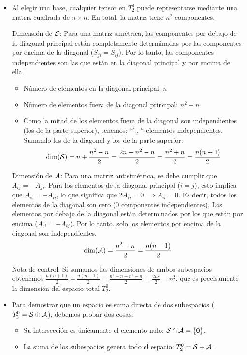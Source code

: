 \documentclass[11pt,spanish]{article}
\begin{document}
\begin{itemize}
Al cumplir las tres propiedades, $\cal{A}$ es un subespacio vectorial de $T_2^0$.

\item[b)]
Al elegir una base, cualquier tensor en $T_2^0$ puede representarse mediante una matriz cuadrada de $n \times n$. En total, la matriz tiene $n^2$ componentes.

Dimensión de $\cal{S}$:
Para una matriz simétrica, las componentes por debajo de la diagonal principal están completamente determinadas por las componentes por encima de la diagonal ($S_{ji} = S_{ij}$). Por lo tanto, las componentes independientes son las que están en la diagonal principal y por encima de ella.
\begin{itemize}
\item Número de elementos en la diagonal principal: $n$
\item Número de elementos fuera de la diagonal principal: $n^2 - n$
\item Como la mitad de los elementos fuera de la diagonal son independientes (los de la parte superior), tenemos: $\frac{n^2 - n}{2}$ elementos independientes.
Sumando los de la diagonal y los de la parte superior:
$$\dim({\cal S}) = n + \frac{n^2 - n}{2} = \frac{2n + n^2 - n}{2} = \frac{n^2 + n}{2} = \frac{n(n+1)}{2}$$
\end{itemize}

Dimensión de $\cal{A}$:
Para una matriz antisimétrica, se debe cumplir que $A_{ij} = -A_{ji}$.
Para los elementos de la diagonal principal ($i = j$), esto implica que $A_{ii} = -A_{ii}$, lo que significa que $2A_{ii} = 0 \implies A_{ii} = 0$. Es decir, todos los elementos de la diagonal son cero (0 componentes independientes).
Los elementos por debajo de la diagonal están determinados por los que están por encima ($A_{ji} = -A_{ij}$). Por lo tanto, solo los elementos por encima de la diagonal son independientes.
$$\dim({\cal A}) = \frac{n^2 - n}{2} = \frac{n(n-1)}{2}$$

Nota de control: Si sumamos las dimensiones de ambos subespacios obtenemos $\frac{n(n+1)}{2} + \frac{n(n-1)}{2} = \frac{n^2+n+n^2-n}{2} = \frac{2n^2}{2} = n^2$, que es precisamente la dimensión del espacio total $T_2^0$.

\item[c)]
Para demostrar que un espacio es suma directa de dos subespacios ($T_2^0 = \cal{S} \oplus \cal{A}$), debemos probar dos cosas:
\begin{itemize}
\item  Su intersección es únicamente el elemento nulo: $\cal{S} \cap \cal{A} = \{\mathbf{0}\}$.
\item   La suma de los subespacios genera todo el espacio: $T_2^0 = \cal{S} + \cal{A}$.
\end{itemize}


\end{itemize}
\end{document}
